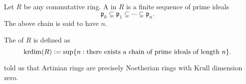 \documentclass[12pt]{article}
\begin{document}
\begin{defn}
	Let $R$ be any commutative ring. A  in $R$ is a finite sequence of prime ideals
	\begin{equation*} 
		\mathfrak{p}_{0} \subsetneq \mathfrak{p}_{1} \subsetneq \cdots \subsetneq \mathfrak{p}_{n}.
	\end{equation*}
	The above chain is said to have  $n$.

	The  of $R$ is defined as 
	\begin{equation*} 
		\operatorname{krdim}(R) \vcentcolon= \sup\{n : \text{there exists a chain of prime ideals of length $n$}\}.
	\end{equation*}
\end{defn}

\begin{ex}
	 told us that Artinian rings are precisely Noetherian rings with Krull dimension zero.
\end{ex}
\end{document}
